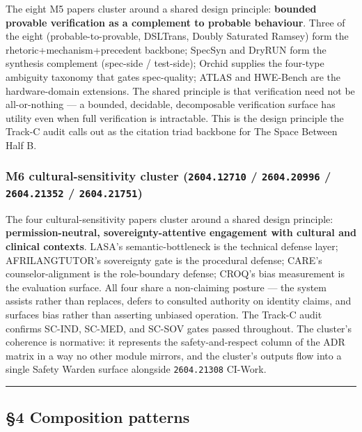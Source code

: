 \documentclass[11pt,letterpaper]{article}
\newcommand{\arxivid}[1]{\texttt{\textcolor{accent}{#1}}}
\begin{document}
The eight M5 papers cluster around a shared design principle:
\textbf{bounded provable verification as a complement to probable
behaviour}. Three of the eight (probable-to-provable, DSLTrans, Doubly
Saturated Ramsey) form the rhetoric+mechanism+precedent backbone;
SpecSyn and DryRUN form the synthesis complement (spec-side /
test-side); Orchid supplies the four-type ambiguity taxonomy that gates
spec-quality; ATLAS and HWE-Bench are the hardware-domain extensions.
The shared principle is that verification need not be all-or-nothing ---
a bounded, decidable, decomposable verification surface has utility even
when full verification is intractable. This is the design principle the
Track-C audit calls out as the citation triad backbone for The Space
Between Half B.

\subsubsection{\texorpdfstring{M6 cultural-sensitivity cluster
(\arxivid{2604.12710} / \arxivid{2604.20996} / \arxivid{2604.21352} /
\arxivid{2604.21751})}{M6 cultural-sensitivity cluster (\arxivid{2604.12710} / \arxivid{2604.20996} / \arxivid{2604.21352} / \arxivid{2604.21751})}}

The four cultural-sensitivity papers cluster around a shared design
principle: \textbf{permission-neutral, sovereignty-attentive engagement
with cultural and clinical contexts}. LASA's semantic-bottleneck is the
technical defense layer; AFRILANGTUTOR's sovereignty gate is the
procedural defense; CARE's counselor-alignment is the role-boundary
defense; CROQ's bias measurement is the evaluation surface. All four
share a non-claiming posture --- the system assists rather than
replaces, defers to consulted authority on identity claims, and surfaces
bias rather than asserting unbiased operation. The Track-C audit
confirms SC-IND, SC-MED, and SC-SOV gates passed throughout. The
cluster's coherence is normative: it represents the safety-and-respect
column of the ADR matrix in a way no other module mirrors, and the
cluster's outputs flow into a single Safety Warden surface alongside
\arxivid{2604.21308} CI-Work.

\begin{center}\rule{0.5\linewidth}{0.5pt}\end{center}

\subsection{§4 Composition patterns}
\end{document}
